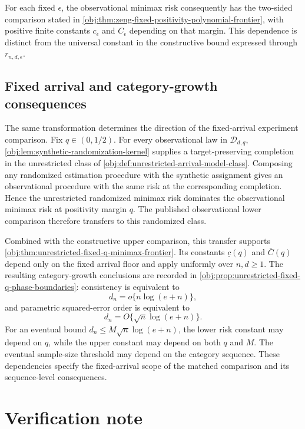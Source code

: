 \documentclass[11pt]{article}
\begin{document}
For each fixed \(\epsilon\), the observational minimax risk  consequently has the two-sided comparison stated in \cref{obj:thm:zeng-fixed-positivity-polynomial-frontier}, with positive finite constants \(c_\epsilon\) and \(C_\epsilon\) depending on that margin. This dependence is distinct from the universal constant in the constructive bound expressed through \(r_{n,d,\epsilon}\).

\subsection{Fixed arrival and category-growth consequences}

The same transformation determines the direction of the fixed-arrival experiment comparison. Fix \(q\in(0,1/2)\). For every observational law in \(\mathcal D_{d,q}\), \cref{obj:lem:synthetic-randomization-kernel} supplies a target-preserving completion in the unrestricted class  of \cref{obj:def:unrestricted-arrival-model-class}. Composing any randomized estimation procedure with the synthetic assignment gives an observational procedure with the same risk at the corresponding completion. Hence the unrestricted randomized minimax risk  dominates the observational minimax risk at positivity margin \(q\). The published observational lower comparison therefore transfers to this randomized class.

Combined with the constructive upper comparison, this transfer supports \cref{obj:thm:unrestricted-fixed-q-minimax-frontier}. Its constants \(\underline c(q)\) and \(\overline C(q)\) depend only on the fixed arrival floor and apply uniformly over \(n,d\ge1\). The resulting category-growth conclusions are recorded in \cref{obj:prop:unrestricted-fixed-q-phase-boundaries}: consistency is equivalent to
\[
d_n=o\{n\log(e+n)\},
\]
and parametric squared-error order is equivalent to
\[
d_n=O\{\sqrt n\log(e+n)\}.
\]
For an eventual bound \(d_n\le M\sqrt n\log(e+n)\), the lower risk constant may depend on \(q\), while the upper constant may depend on both \(q\) and \(M\). The eventual sample-size threshold may depend on the category sequence. These dependencies specify the fixed-arrival scope of the matched comparison and its sequence-level consequences.


\section{Verification note}
\end{document}

